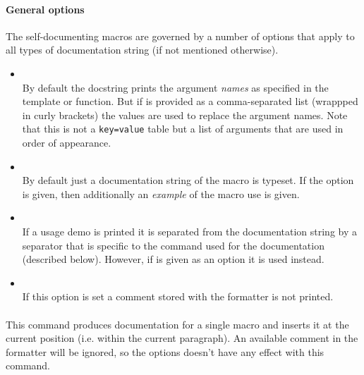 \documentclass[12pt]{scrartcl}
\begin{document}
\paragraph{General options}

The self-documenting macros are governed by a number of options that apply to
all types of documentation string (if not mentioned otherwise).

\begin{itemize}
\item {}\\
By default the docstring prints the argument \emph{names} as specified in the
template or function.  But if  is provided as a comma-separated
list (wrappped in curly brackets) the values are used to replace the argument
names.  Note that this is not a \texttt{key=value} table but a list of arguments
that are used in order of appearance.
\item {}\\
By default just a documentation string of the macro is typeset.  If the
 option is given, then additionally an \emph{example} of the macro
use is given.
\item {}\\
If a usage demo is printed it is separated from the documentation string by a
separator that is specific to the command used for the documentation (described
below).  However, if  is given as an option it is used instead.
\item {}\\
If this option is set a comment stored with the formatter is not printed.
\end{itemize}

\paragraph{\texttt{}}

This command produces documentation for a single macro and inserts it at the
current position (i.e. within the current paragraph).  An available comment in
the formatter will be ignored, so the  options doesn't have
any effect with this command.
\end{document}
